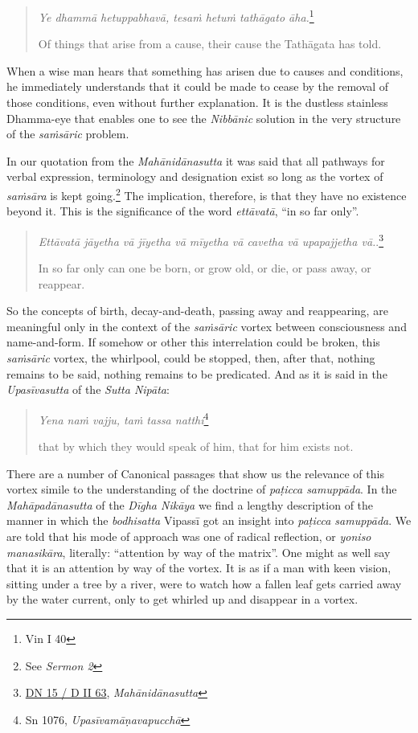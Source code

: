 \begin{quote}
\emph{Ye dhammā hetuppabhavā, tesaṁ hetuṁ tathāgato āha.}\footnote{Vin I 40}

Of things that arise from a cause, their cause the Tathāgata has told.
\end{quote}

When a wise man hears that something has arisen due to causes and conditions, he immediately understands that it could be made to cease by the removal of those conditions, even without further explanation. It is the dustless stainless Dhamma-eye that enables one to see the \emph{Nibbānic} solution in the very structure of the \emph{saṁsāric} problem.

In our quotation from the \emph{Mahānidānasutta} it was said that all pathways for verbal expression, terminology and designation exist so long as the vortex of \emph{saṁsāra} is kept going.\footnote{See \emph{Sermon 2}} The implication, therefore, is that they have no existence beyond it. This is the significance of the word \emph{ettāvatā}, ``in so far only''.

\begin{quote}
\emph{Ettāvatā jāyetha vā jīyetha vā mīyetha vā cavetha vā upapajjetha vā.}.\footnote{\href{https://suttacentral.net/dn15/pli/ms}{DN 15 / D II 63}, \emph{Mahānidānasutta}}

In so far only can one be born, or grow old, or die, or pass away, or reappear.
\end{quote}

So the concepts of birth, decay-and-death, passing away and reappearing, are meaningful only in the context of the \emph{saṁsāric} vortex between consciousness and name-and-form. If somehow or other this interrelation could be broken, this \emph{saṁsāric} vortex, the whirlpool, could be stopped, then, after that, nothing remains to be said, nothing remains to be predicated. And as it is said in the \emph{Upasīvasutta} of the \emph{Sutta Nipāta}:

\begin{quote}
\emph{Yena naṁ vajju, taṁ tassa natthi}\footnote{Sn 1076, \emph{Upasīvamāṇavapucchā}}

that by which they would speak of him, that for him exists not.
\end{quote}

There are a number of Canonical passages that show us the relevance of this vortex simile to the understanding of the doctrine of \emph{paṭicca samuppāda}. In the \emph{Mahāpadānasutta} of the \emph{Dīgha Nikāya} we find a lengthy description of the manner in which the \emph{bodhisatta} Vipassī got an insight into \emph{paṭicca samuppāda}. We are told that his mode of approach was one of radical reflection, or \emph{yoniso manasikāra}, literally: ``attention by way of the matrix''. One might as well say that it is an attention by way of the vortex. It is as if a man with keen vision, sitting under a tree by a river, were to watch how a fallen leaf gets carried away by the water current, only to get whirled up and disappear in a vortex.

